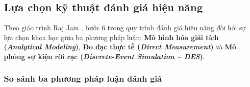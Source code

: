\subsection{Lựa chọn kỹ thuật đánh giá hiệu năng}
\label{subsec:ky-thuat-danh-gia}

\hspace{0.5cm}Theo giáo trình Raj Jain \cite{ref_jain}, bước 6 trong quy trình đánh giá hiệu năng đòi hỏi sự lựa chọn khoa học giữa ba phương pháp luận: \textbf{Mô hình hóa giải tích (\textit{Analytical Modeling})}, \textbf{Đo đạc thực tế (\textit{Direct Measurement})} và \textbf{Mô phỏng sự kiện rời rạc (\textit{Discrete-Event Simulation -- DES})}.

\subsubsection{So sánh ba phương pháp luận đánh giá}
